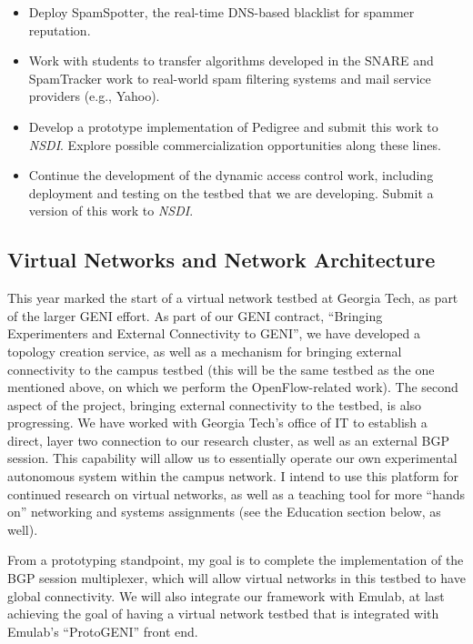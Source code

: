 \begin{sloppypar}


\begin{itemize}
\itemsep=-1pt
\item Deploy SpamSpotter, the real-time DNS-based blacklist for spammer
reputation. 
\item Work with students to transfer algorithms developed in the SNARE
and SpamTracker work to real-world spam filtering systems and mail
service providers (e.g., Yahoo).
\item Develop a prototype implementation of Pedigree and submit this
work to {\em NSDI}.  Explore possible commercialization opportunities
along these lines.
\item Continue the development of the dynamic access control work,
including deployment and testing on the testbed that we are developing.
Submit a version of this work to {\em NSDI}.
\end{itemize}

\subsection*{Virtual Networks and Network Architecture}


This year marked the start of a virtual network testbed at Georgia Tech,
as part of the larger GENI effort.  As part of our GENI contract,
``Bringing Experimenters and External Connectivity to GENI'', we have
developed a topology creation service, as well as a mechanism for
bringing external connectivity to the campus testbed (this will be the
same testbed as the one mentioned above, on which we perform the
OpenFlow-related work).  The second aspect of the project, bringing
external connectivity to the testbed, is also progressing.  We have
worked with Georgia Tech's office of IT to establish a direct, layer two
connection to our research cluster, as well as an external BGP session.
This capability will allow us to essentially operate our own
experimental autonomous system within the campus network.  I intend to
use this platform for continued research on virtual networks, as well as
a teaching tool for more ``hands on'' networking and systems assignments
(see the Education section below, as well).

From a prototyping standpoint, my goal is to complete the implementation
of the BGP session multiplexer, which will allow virtual networks in
this testbed to have global connectivity.  We will also integrate our
framework with Emulab, at last achieving the goal of having a virtual
network testbed that is integrated with Emulab's ``ProtoGENI'' front
end.


\end{sloppypar}
